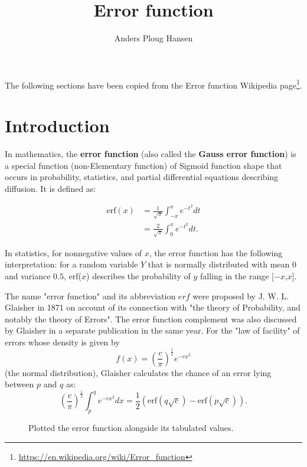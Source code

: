 \documentclass[twocolumn]{article}
\begin{document}
\title{Error function}
\author{Anders Ploug Hansen}

\maketitle

The following sections have been copied from the Error function Wikipedia page\footnote{\url{https://en.wikipedia.org/wiki/Error_function}}.

\section{Introduction}
In mathematics, the \textbf{error function} (also called the \textbf{Gauss error function}) is a special function (non-Elementary function) of Sigmoid function shape that occurs in probability, statistics, and partial differential equations describing diffusion. It is defined as:

\begin{align}
\mathrm{erf}(x) & = \frac{1}{\sqrt{\pi}}\int_{-x}^x e^{-t^2} dt \\
& = \frac{2}{\sqrt{\pi}}\int_0^x e^{-t^2} dt.
\end{align} 


In statistics, for nonnegative values of $x$, the error function has the following interpretation: for a random variable $Y$ that is normally distributed with mean $0$ and variance $0.5$, erf($x$) describes the probability of $y$ falling in the range [$-x$,$x$].

The name "error function" and its abbreviation $erf$ were proposed by J. W. L. Glaisher in 1871 on account of its connection with "the theory of Probability, and notably the theory of Errors". The error function complement was also discussed by Glaisher in a separate publication in the same year. For the "law of facility" of errors whose density is given by 
\begin{equation}
f(x)=\left(\frac{c}{\pi}\right)^{\frac{1}{2}}e^{-cx^2}
\end{equation}
(the normal distribution), Glaisher calculates the chance of an error lying between $p$ and $q$ as:
\begin{equation}
\left(\frac{c}{\pi}\right)^{\frac{1}{2}} \int_p^qe^{-cx^2}dx =\frac{1}{2}\left(\mathrm{erf} (q\sqrt{c}) -\mathrm{erf} (p\sqrt{c})\right)\mathrm{.}
\end{equation}


\begin{figure}
	
	\caption{Plotted the error function alongside its tabulated values.}
	\label{fig:erf}
\end{figure}
\end{document}
